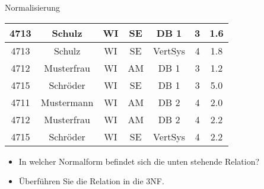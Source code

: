 {\begin{frame}{\insertsection}
\begin{alertblock}{Normalisierung}
{\begin{tabular}{|c|c|c|c|c|c|c|}
				4713 & Schulz & WI & SE &  DB 1 & 3 & 1.6 \\\hline
				4713 & Schulz & WI & SE &  VertSys & 4 & 1.8 \\\hline
				4712 & Musterfrau & WI & AM &  DB 1 & 3 & 1.2 \\\hline
				4715 & Schröder & WI & SE &  DB 1 & 3 & 5.0 \\\hline
				4711 & Mustermann & WI & AM &  DB 2 & 4 & 2.0 \\\hline
				4712 & Musterfrau & WI & AM &  DB 2 & 4 & 2.2 \\\hline
				4715 & Schröder & WI & SE &  VertSys & 4 & 2.2 \\\hline
			\end{tabular}			
		}
		\begin{itemize}
			\item In welcher Normalform befindet sich die unten stehende Relation? 
			\item Überführen Sie die Relation in die 3NF.
		\end{itemize}
	\end{alertblock}	
\end{frame}
}
